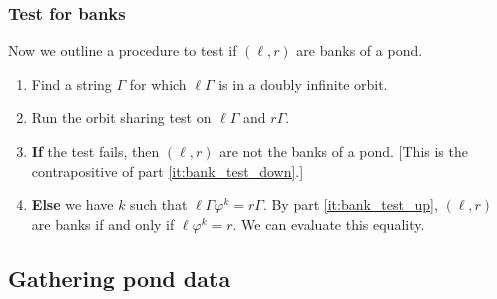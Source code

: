 \documentclass[12pt]{article}
\let\phi\varphi
\newcommand\alert\textbf
\begin{document}
\subsubsection{Test for banks}
Now we outline a procedure to test if $(\ell, r)$ are banks of a pond.
\begin{enumerate}
	\item Find a string $\Gamma$ for which $\ell\Gamma$ is in a doubly infinite orbit.
	\item Run the orbit sharing test on $\ell\Gamma$ and $r\Gamma$.
	\item \alert{If} the test fails, then $(\ell, r)$ are not the banks of a pond. [This is the contrapositive of part \ref{it:bank_test_down}.]
	\item \alert{Else} we have $k$ such that $\ell\Gamma\phi^k = r \Gamma$. By part \ref{it:bank_test_up}, $(\ell, r)$ are banks if and only if $\ell\phi^k=r$. We can evaluate this equality.

\end{enumerate}

\subsection{Gathering pond data}
\end{document}
